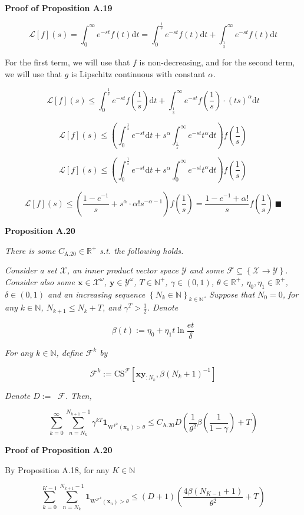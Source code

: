 \documentclass[a4paper]{article}
\newcommand{\Co}[1]{}
\newcommand{\AP}[1]{\left(#1\right)}
\newcommand{\AB}[1]{\left[#1\right]}
\newcommand{\AC}[1]{\left\{#1\right\}}
\newcommand{\Nats}{\mathbb{N}}
\newcommand{\Reals}{\mathbb{R}}
\newcommand{\D}{\mathrm{d}} %
\newcommand{\La}{\mathcal{L}}
\DeclareMathOperator{\RVO}{\dim_{RVO}}
\newcommand{\X}{\mathcal{X}}
\newcommand{\Y}{\mathcal{Y}}
\newcommand{\F}{\mathcal{F}}
\newcommand{\CS}{\mathrm{CS}}
\newcommand{\W}{\mathrm{W}}
\begin{document}
\textbf{Proof of Proposition A.19}\Co{b}

$$\La[f](s)=\int_0^\infty e^{-st}f(t)\D t=\int_0^{\frac{1}{s}}e^{-st}f(t)\D t+\int_{\frac{1}{s}}^\infty e^{-st}f(t)\D t$$

For the first term, we will use that $f$ is non-decreasing, and for the second term, we will use that $g$ is Lipschitz continuous with constant $\alpha$.

$$\La[f](s)\leq\int_0^{\frac{1}{s}}e^{-st}f\AP{\frac{1}{s}}\D t+\int_{\frac{1}{s}}^\infty e^{-st}f\AP{\frac{1}{s}}\cdot\AP{ts}^\alpha\D t$$

$$\La[f](s)\leq\AP{\int_0^{\frac{1}{s}}e^{-st}\D t+s^\alpha\int_{\frac{1}{s}}^\infty e^{-st}t^\alpha\D t}f\AP{\frac{1}{s}}$$

$$\La[f](s)\leq\AP{\int_0^{\frac{1}{s}}e^{-st}\D t+s^\alpha\int_{0}^\infty e^{-st}t^\alpha\D t}f\AP{\frac{1}{s}}$$

$$\La[f](s)\leq\AP{\frac{1-e^{-1}}{s}+s^\alpha\cdot\alpha!s^{-\alpha-1}}f\AP{\frac{1}{s}}=\frac{1-e^{-1}+\alpha!}{s}f\AP{\frac{1}{s}}\ \blacksquare$$

\textbf{Proposition A.20}\Co{b}

\textit{There is some $C_{\mathrm{A.20}}\in\Reals^+$ s.t. the following holds.}\Co{i}

\textit{Consider a set $\X$, an inner product vector space $\Y$ and some $\F\subseteq\AC{\X\rightarrow\Y}$. Consider also some $\boldsymbol{x}\in\X^\omega$, $\boldsymbol{y}\in\Y^\omega$, $T\in\Nats^+$, $\gamma\in(0,1)$, $\theta\in\Reals^+$, $\eta_0,\eta_1\in\Reals^+$, $\delta\in(0,1)$ and an increasing sequence $\AC{N_k\in\Nats}_{k\in\Nats}$. Suppose that $N_0=0$, for any $k\in\Nats$, $N_{k+1}\leq N_k+T$, and $\gamma^T>\frac{1}{2}$. Denote}\Co{i}

$$\beta(t):=\eta_0 + \eta_1t\ln{\frac{et}{\delta}}$$

\textit{For any $k\in\Nats$, define $\F^k$ by}\Co{i}

$$\F^k:=\CS^\F\AB{\boldsymbol{xy}_{:N_k},\beta\AP{N_k+1}^{-1}}$$

\textit{Denote $D:=\RVO\F$. Then,}\Co{i}

$$\sum_{k=0}^\infty\sum_{n=N_k}^{N_{k+1}-1}{\gamma^{kT}\boldsymbol{1}_{\W^{F^k}\AP{\boldsymbol{x}_{n}}>\theta}} \leq C_{\mathrm{A.20}}D\AP{\frac{1}{\theta^2}\beta\AP{\frac{1}{1-\gamma}}+T}$$

\textbf{Proof of Proposition A.20}\Co{b}

By Proposition A.18, for any $K\in\Nats$

$$\sum_{k=0}^{K-1}\sum_{n=N_k}^{N_{k+1}-1}{\boldsymbol{1}_{\W^{\F^k}\AP{\boldsymbol{x}_{n}}>\theta}
} \leq(D+1)\AP{\frac{4\beta\AP{N_{K-1}+1}}{\theta^{2}}+T}$$
\end{document}
